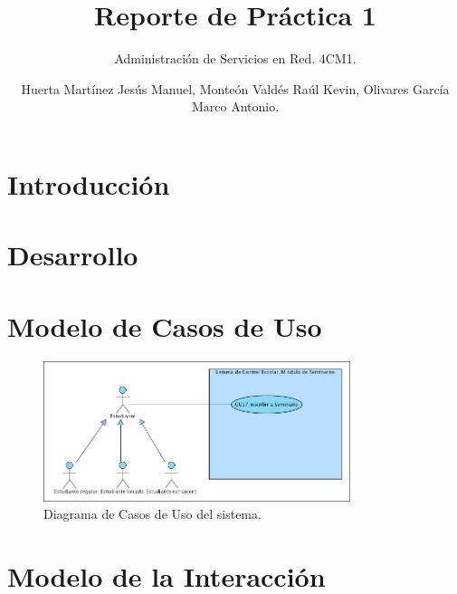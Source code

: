 \documentclass[oneside,10pt]{book}
\title{Reporte de Práctica 1}
\subtitle{Administración de Servicios en Red. 4CM1.}
\author{Huerta Martínez Jesús Manuel, Monteón Valdés Raúl Kevin, Olivares García Marco Antonio.}
\begin{document}
\maketitle
\thispagestyle{empty}

\frontmatter
\tableofcontents

\mainmatter


\chapter{Introducción}



\chapter{Desarrollo}


\chapter{Modelo de Casos de Uso}
	
	\begin{figure}[htbp!]
		\centering
			\includegraphics[width=0.8\textwidth]{images/CasosDeUso}
		\caption{Diagrama de Casos de Uso del sistema.}
	\end{figure}
	

\chapter{Modelo de la Interacción}
\end{document}
